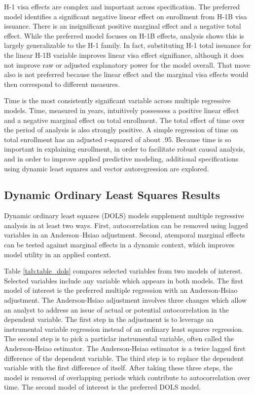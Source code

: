 \documentclass[review]{elsarticle}
\begin{document}
    H-1 visa effects are complex and important across specification.
    The preferred model identifies a significant negative linear effect on enrollment
    from H-1B visa issuance.
    There is an insignificant positive marginal effect and a negative total effect.
    While the preferred model focuses on H-1B effects, analysis shows this is largely
    generalizable to the H-1 family.
    In fact, substituting H-1 total issuance for the linear H-1B variable improves
    linear visa effect signifiance,
    although it does not improve raw or adjusted explanatory power for the model overall.
    That move also is not preferred because the linear effect and the marginal visa effects would then correspond to different measures.

    Time is the most consistently significant variable across multiple regressive models.
    Time, measured in years, intuitively possessess a positive linear effect and a negative marginal effect on total enrollment.
    The total effect of time over the period of analysis is also strongly positive.
    A simple regression of time on total enrollment has an adjusted r-squared of about .95.
    Because time is so important in explaining enrollment,
    in order to facilitate robust causal analysis,
    and in order to improve applied predictive modeling,
    additional specifications using dynamic least squares and vector autoregression
    are explored.

    \subsection{Dynamic Ordinary Least Squares Results}

    Dynamic ordinary least squares (DOLS) models supplement multiple regressive analysis in at least two ways.
    First, autocorrelation can be removed using lagged variables in an Anderson–Hsiao adjustment\cite{anderson1981estimation}.
    Second, atemporal marginal effects can be tested against marginal effects in a dynamic context,
    which improves model utility in an applied context.

    Table \ref{tab:table_dols} compares selected variables from two models of interest.
    Selected variables include any variable which appears in both models.
    The first model of interest is the preferred multiple regression with an Anderson-Hsiao adjustment.
    The Anderson-Hsiao adjustment involves three changes which allow an analyst to address an issue of actual or potential autocorrelation in the dependent variable.
    The first step in the adjustment is to leverage an instrumental variable regression instead of an ordinary least squares regression.
    The second step is to pick a particlar instrumental variable, often called the Anderson-Hsiao estimator.
    The Anderson-Hsiao estimator is a twice lagged first difference of the dependent variable.
    The third step is to replace the dependent variable with the first difference of itself.
    After taking these three steps, the model is removed of overlapping periods which contribute to autocorrelation over time.
    The second model of interest is the preferred DOLS model.
    
\end{document}
